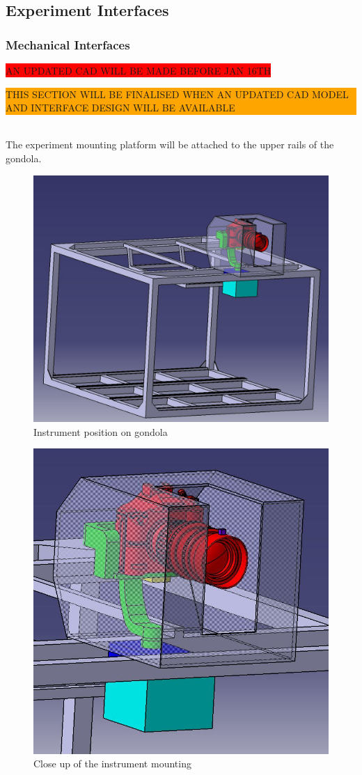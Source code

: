 \subsection{Experiment Interfaces}

\subsubsection{Mechanical Interfaces}
\label{sec:4.2.1}

\colorbox{red}{AN UPDATED CAD WILL BE MADE BEFORE JAN 16TH}\\
\colorbox{orange}{\parbox{\textwidth}{THIS SECTION WILL BE FINALISED WHEN AN UPDATED CAD MODEL AND INTERFACE DESIGN WILL BE AVAILABLE}}\\

The experiment mounting platform will be attached to the upper rails of the gondola.



\begin{figure}[H]
    \centering
	\includegraphics[width=0.6\linewidth]{4-experiment-design/img/interfaces/Screenshot_Experiment.jpg}
	\caption{Instrument position on gondola}
\end{figure}

\begin{figure}[H]
    \centering
	\includegraphics[width=0.6\linewidth]{4-experiment-design/img/interfaces/Screenshot_Close_Up.jpg}
	\caption{Close up of the instrument mounting}
\end{figure}


